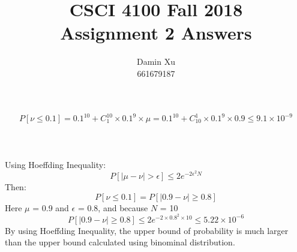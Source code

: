 \documentclass[11pt]{article}
\title{CSCI 4100 Fall 2018 \\
Assignment 2 Answers}
\author{Damin Xu\\661679187}
\begin{document}
\maketitle

\[
P[\nu\leq0.1]=0.1^{10}+C^{10}_1\times0.1^9\times\mu=0.1^{10}+C^1_{10}\times0.1^9\times0.9\leq9.1\times10^{-9}
\]
\\\\
\\Using Hoeffding Inequality: 
\[
P[|\mu-\nu|>\epsilon]\leq2e^{-2\epsilon^2N}
\]
Then:
\[
P[\nu\leq0.1]=P[|0.9-\nu|\geq0.8]
\]
Here $\mu$ = 0.9 and $\epsilon$ = 0.8, and because $N$ = 10
\[
P[|0.9-\nu|\geq0.8] \leq 2e^{-2\times0.8^2\times10} \leq 5.22\times10^{-6}
\]
By using Hoeffding Inequality, the upper bound of probability is much larger than the upper bound calculated using binominal distribution.

\newpage
\end{document}
